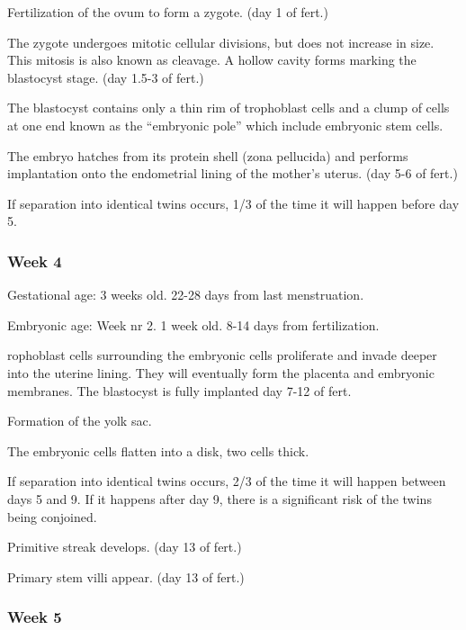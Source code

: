 \documentclass[12pt,a4paper,onecolumn]{article}
\begin{document}
\begin{wuxch_item}
    \item Fertilization of the ovum to form a zygote. (day 1 of fert.)
    \item The zygote undergoes mitotic cellular divisions, but does not increase in size. This
      mitosis is also known as cleavage. A hollow cavity forms marking the blastocyst stage. (day
      1.5-3 of fert.)
    \item The blastocyst contains only a thin rim of trophoblast cells and a clump of cells at
      one end known as the ``embryonic pole'' which include embryonic stem cells.
    \item The embryo hatches from its protein shell (zona pellucida) and performs implantation
      onto the endometrial lining of the mother's uterus. (day 5-6 of fert.)
    \item If separation into identical twins occurs, 1/3 of the time it will happen before day 5.
\end{wuxch_item}

\subsubsection{Week 4}

Gestational age: 3 weeks old. 22-28 days from last menstruation.

Embryonic age: Week nr 2. 1 week old. 8-14 days from fertilization.

\begin{wuxch_item}
    \item rophoblast cells surrounding the embryonic cells proliferate and invade deeper into the
  uterine lining. They will eventually form the placenta and embryonic membranes. The blastocyst is
  fully implanted day 7-12 of fert.
    \item Formation of the yolk sac.
    \item The embryonic cells flatten into a disk, two cells thick.
    \item If separation into identical twins occurs, 2/3 of the time it will happen between days 5
      and 9. If it happens after day 9, there is a significant risk of the twins being conjoined.
    \item Primitive streak develops. (day 13 of fert.)
    \item Primary stem villi appear. (day 13 of fert.)
\end{wuxch_item}

\subsubsection{Week 5}
\end{document}
